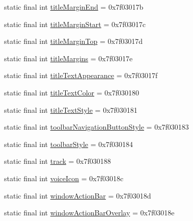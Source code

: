 \begin{DoxyCompactItemize}
\item 
static final int \mbox{\hyperlink{classcom_1_1google_1_1android_1_1gms_1_1R_1_1attr_a83c5b34101ac5a6ae1fbd0ab8bfb542c}{title\+Margin\+End}} = 0x7f03017b
\item 
static final int \mbox{\hyperlink{classcom_1_1google_1_1android_1_1gms_1_1R_1_1attr_a52d5d99f389b95eb38482cd1de3d9d0a}{title\+Margin\+Start}} = 0x7f03017c
\item 
static final int \mbox{\hyperlink{classcom_1_1google_1_1android_1_1gms_1_1R_1_1attr_abe2ded23ae12459bd0a9a194a2aedcb9}{title\+Margin\+Top}} = 0x7f03017d
\item 
static final int \mbox{\hyperlink{classcom_1_1google_1_1android_1_1gms_1_1R_1_1attr_a0ad16ab5323c6346c8377c84806a5399}{title\+Margins}} = 0x7f03017e
\item 
static final int \mbox{\hyperlink{classcom_1_1google_1_1android_1_1gms_1_1R_1_1attr_a9303109a5c92643bcaa27f6260d30ee6}{title\+Text\+Appearance}} = 0x7f03017f
\item 
static final int \mbox{\hyperlink{classcom_1_1google_1_1android_1_1gms_1_1R_1_1attr_aa78db0f2bdfb690db23837259cea641e}{title\+Text\+Color}} = 0x7f030180
\item 
static final int \mbox{\hyperlink{classcom_1_1google_1_1android_1_1gms_1_1R_1_1attr_a125a479105ab5f278b8ccc18ccc8ee63}{title\+Text\+Style}} = 0x7f030181
\item 
static final int \mbox{\hyperlink{classcom_1_1google_1_1android_1_1gms_1_1R_1_1attr_ade3aef9d663a8ed5902c67bb9abd5c1a}{toolbar\+Navigation\+Button\+Style}} = 0x7f030183
\item 
static final int \mbox{\hyperlink{classcom_1_1google_1_1android_1_1gms_1_1R_1_1attr_ae216e63358b6f530c6a21d4f362a7898}{toolbar\+Style}} = 0x7f030184
\item 
static final int \mbox{\hyperlink{classcom_1_1google_1_1android_1_1gms_1_1R_1_1attr_a6ea4f8d34e79eee44325691ec711c801}{track}} = 0x7f030188
\item 
static final int \mbox{\hyperlink{classcom_1_1google_1_1android_1_1gms_1_1R_1_1attr_aca74723e9ecd601d386d6413437b5a7c}{voice\+Icon}} = 0x7f03018c
\item 
static final int \mbox{\hyperlink{classcom_1_1google_1_1android_1_1gms_1_1R_1_1attr_a49d928ab116d6f3bd39560e84ed3b780}{window\+Action\+Bar}} = 0x7f03018d
\item 
static final int \mbox{\hyperlink{classcom_1_1google_1_1android_1_1gms_1_1R_1_1attr_ad3ded7b0a262168979e09d374807b4bc}{window\+Action\+Bar\+Overlay}} = 0x7f03018e

\end{DoxyCompactItemize}
